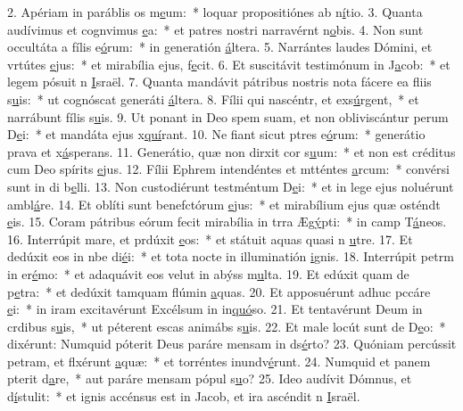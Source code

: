 2. Apériam in paráblis os m\uline{e}um:~* loquar propositiónes ab n\uline{í}tio.
3. Quanta audívimus et cognvimus \uline{e}a:~* et patres nostri narravérnt n\uline{o}bis.
4. Non sunt occultáta a fílis e\uline{ó}rum:~* in generatión \uline{á}ltera.
5. Narrántes laudes Dómini, et vrtútes \uline{e}jus:~* et mirabília ejus,  f\uline{e}cit.
6. Et suscitávit testimónum in J\uline{a}cob:~* et legem pósuit n \uline{I}sraël.
7. Quanta mandávit pátribus nostris nota fácere ea fliis s\uline{u}is:~* ut cognóscat generáti \uline{á}ltera.
8. Fílii qui nascéntr, et exs\uline{ú}rgent,~* et narrábunt fílis s\uline{u}is.
9. Ut ponant in Deo spem suam, et non obliviscántur perum D\uline{e}i:~* et mandáta ejus x\uline{quí}rant.
10. Ne fiant sicut ptres e\uline{ó}rum:~* generátio prava et x\uline{á}sperans.
11. Generátio, quæ non dirxit cor s\uline{u}um:~* et non est créditus cum Deo spírits \uline{e}jus.
12. Fílii Ephrem intendéntes et mtténtes \uline{a}rcum:~* convérsi sunt in di b\uline{e}lli.
13. Non custodiérunt testméntum D\uline{e}i:~* et in lege ejus noluérunt ambl\uline{á}re.
14. Et oblíti sunt benefctórum \uline{e}jus:~* et mirabílium ejus quæ osténdt \uline{e}is.
15. Coram pátribus eórum fecit mirabília in trra Æg\uline{ý}pti:~* in camp T\uline{á}neos.
16. Interrúpit mare, et prdúxit \uline{e}os:~* et státuit aquas quasi n \uline{u}tre.
17. Et dedúxit eos in nbe di\uline{é}i:~* et tota nocte in illuminatión \uline{i}gnis.
18. Interrúpit petrm in er\uline{é}mo:~* et adaquávit eos velut in abýss m\uline{u}lta.
19. Et edúxit quam de p\uline{e}tra:~* et dedúxit tamquam flúmin \uline{a}quas.
20. Et apposuérunt adhuc pccáre \uline{e}i:~* in iram excitavérunt Excélsum in in\uline{quó}so.
21. Et tentavérunt Deum in crdibus s\uline{u}is,~* ut péterent escas animábs s\uline{u}is.
22. Et male locút sunt de D\uline{e}o:~* dixérunt: Numquid póterit Deus paráre mensam in ds\uline{é}rto?
23. Quóniam percússit petram, et flxérunt \uline{a}quæ:~* et torréntes inundv\uline{é}runt.
24. Numquid et panem pterit d\uline{a}re,~* aut paráre mensam pópul s\uline{u}o?
25. Ideo audívit Dómnus, et d\uline{í}stulit:~* et ignis accénsus est in Jacob, et ira ascéndit n \uline{I}sraël.
